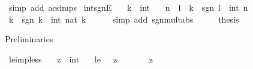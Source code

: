 \begin{isabellebody}
\ {\isacharparenleft}{\kern0pt}simp\ add{\isacharcolon}{\kern0pt}\ ac{\isacharunderscore}{\kern0pt}simps{\isacharparenright}{\kern0pt}%
\endisatagproof
{\isafoldproof}%
%
\isadelimproof
\isanewline
%
\endisadelimproof
\isanewline
{}\isamarkupfalse%
\ int{\isacharunderscore}{\kern0pt}sgnE{\isacharcolon}{\kern0pt}\isanewline
\ \ \ k\ {\isacharcolon}{\kern0pt}{\isacharcolon}{\kern0pt}\ int\isanewline
\ \ \ n\ \ l\ \ {\isachardoublequoteopen}k\ {\isacharequal}{\kern0pt}\ sgn\ l\ {\isacharasterisk}{\kern0pt}\ int\ n{\isachardoublequoteclose}\isanewline
%
\isadelimproof
%
\endisadelimproof
%
\isatagproof
{}\isamarkupfalse%
\ {\isacharminus}{\kern0pt}\isanewline
\ \ \isamarkupfalse%
\ {\isachardoublequoteopen}k\ {\isacharequal}{\kern0pt}\ sgn\ k\ {\isacharasterisk}{\kern0pt}\ int\ {\isacharparenleft}{\kern0pt}nat\ {\isasymbar}k{\isasymbar}{\isacharparenright}{\kern0pt}{\isachardoublequoteclose}\isanewline
\ \ \ \ \isamarkupfalse%
\ {\isacharparenleft}{\kern0pt}simp\ add{\isacharcolon}{\kern0pt}\ sgn{\isacharunderscore}{\kern0pt}mult{\isacharunderscore}{\kern0pt}abs{\isacharparenright}{\kern0pt}\isanewline
\ \ \isamarkupfalse%
\ \isamarkupfalse%
\ {\isacharquery}{\kern0pt}thesis\ \isacommand{{\isachardot}{\kern0pt}{\isachardot}{\kern0pt}}\isamarkupfalse%
\isanewline
{}\isamarkupfalse%
%
\endisatagproof
{\isafoldproof}%
%
\isadelimproof
%
\endisadelimproof
%
\isadelimdocument
%
\endisadelimdocument
%
\isatagdocument
%
\isamarkuptrue%
%
\endisatagdocument
{\isafolddocument}%
%
\isadelimdocument
%
\endisadelimdocument
%
\begin{isamarkuptext}%
Preliminaries%
\end{isamarkuptext}\isamarkuptrue%
\isamarkupfalse%
\ le{\isacharunderscore}{\kern0pt}imp{\isacharunderscore}{\kern0pt}{}{\isacharunderscore}{\kern0pt}less{\isacharcolon}{\kern0pt}\isanewline
\ \ \ z\ {\isacharcolon}{\kern0pt}{\isacharcolon}{\kern0pt}\ int\isanewline
\ \ \ le{\isacharcolon}{\kern0pt}\ {\isachardoublequoteopen}{}\ {\isasymle}\ z{\isachardoublequoteclose}\isanewline
\ \ \ {\isachardoublequoteopen}{}\ {\isacharless}{\kern0pt}\ {}\ {\isacharplus}{\kern0pt}\ z{\isachardoublequoteclose}\isanewline
%
\isadelimproof
%
\endisadelimproof
%
\isatagproof
{}\isamarkupfalse%

\end{isabellebody}
